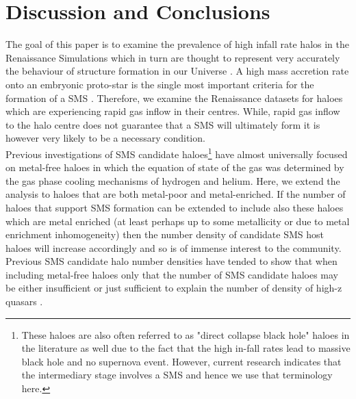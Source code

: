 \documentclass[graphics, twocolumn, usenatbib]{mn2e}
\begin{document}
\section{Discussion and Conclusions} \label{Sec:Discussion}
The goal of this paper is to examine the prevalence of high infall rate halos in the
Renaissance Simulations which in turn are thought to represent very accurately the
behaviour of structure formation in our Universe \citep{Chen_2014, Xu_2013, Xu_2014, OShea_2015,
  Barrow_2017, Wise_2019}. A high mass accretion rate onto an embryonic proto-star is the
single most important criteria for the formation of a SMS \citep{Hosokawa_2013, Sakurai_2016,
  Woods_2018}. Therefore, we examine the Renaissance datasets for haloes which are experiencing
rapid gas inflow in their centres. While, rapid gas inflow to the halo centre does not guarantee
that a SMS will ultimately form it is however very likely to be a necessary condition. \\
\indent Previous investigations of SMS candidate haloes\footnote{These haloes are also often
  referred to as "direct collapse black hole" haloes in the literature as well due to the fact
  that the high in-fall rates lead to massive black hole and no 
  supernova event. However, current research indicates that the intermediary stage involves a
  SMS and hence we use that terminology here.} have almost universally focused on
metal-free haloes in which the equation of state of the gas was determined by the gas phase
cooling mechanisms of hydrogen and helium. Here, we extend the analysis to haloes that are both
metal-poor and metal-enriched. If the number of haloes that support SMS formation can be extended to
include also these haloes which are metal enriched (at least perhaps up to some metallicity or
due to metal enrichment inhomogeneity) then the
number density of candidate SMS host haloes will increase accordingly and so is of
immense interest to the community. Previous SMS candidate halo number densities have
tended to show that when including metal-free haloes only that the number of SMS candidate
haloes may be either insufficient or just sufficient to explain the number of density of
high-z quasars \citep{Agarwal_2012, Visbal_2014b, Agarwal_2015b, Latif_2014a,
  Valiante_2016, Habouzit_2016, Valiante_2017, Habouzit_2017, Regan_2017}. \\
\end{document}
